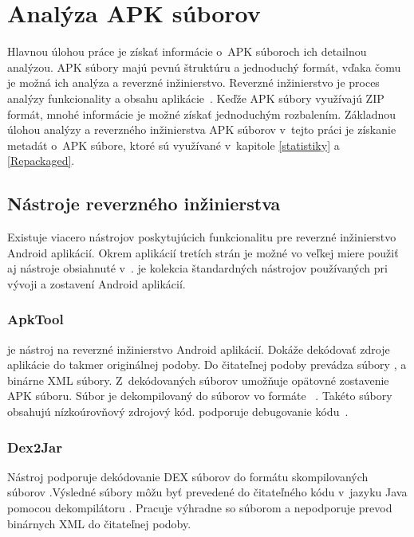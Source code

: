 \chapter{Analýza APK súborov}
\label{analyza}
Hlavnou úlohou práce je získať informácie o~APK súboroch ich detailnou analýzou. APK súbory majú pevnú štruktúru a jednoduchý formát, vďaka čomu je možná ich analýza a reverzné inžinierstvo. Reverzné inžinierstvo je proces analýzy funkcionality a obsahu aplikácie~\cite{reverse}. Keďže APK súbory využívajú ZIP formát, mnohé informácie je možné získať jednoduchým rozbalením. Základnou úlohou analýzy a reverzného inžinierstva APK súborov v~tejto práci je získanie metadát o~APK súbore, ktoré sú využívané v~kapitole \ref{statistiky} a \ref{Repackaged}.

\section{Nástroje reverzného inžinierstva}
\label{nastroje_revezneho_inzinierstva}

Existuje viacero nástrojov poskytujúcich funkcionalitu pre reverzné inžinierstvo Android aplikácií. Okrem aplikácií tretích strán je možné vo veľkej miere použiť aj nástroje obsiahnuté v~.  je kolekcia štandardných nástrojov používaných pri vývoji a zostavení Android aplikácií. 

\subsection{ApkTool}
\label{ApkTool}
 je nástroj na reverzné inžinierstvo Android aplikácií. Dokáže dekódovať zdroje aplikácie do takmer originálnej podoby. Do čitateľnej podoby prevádza súbory ,  a binárne XML súbory. Z~dekódovaných súborov umožňuje opätovné zostavenie APK súboru. Súbor  je dekompilovaný do súborov vo formáte ~\cite{Nolan2012a}. Takéto súbory obsahujú nízkoúrovňový zdrojový kód.  podporuje debugovanie  kódu~\cite{apkTool}.

\subsection{Dex2Jar}
\label{Dex2Jar}
Nástroj  podporuje dekódovanie DEX súborov do formátu skompilovaných  súborov .Výsledné  súbory môžu byť prevedené do čitateľného kódu v~jazyku Java pomocou dekompilátoru . Pracuje výhradne so súborom  a nepodporuje prevod binárnych XML do čitateľnej podoby.


